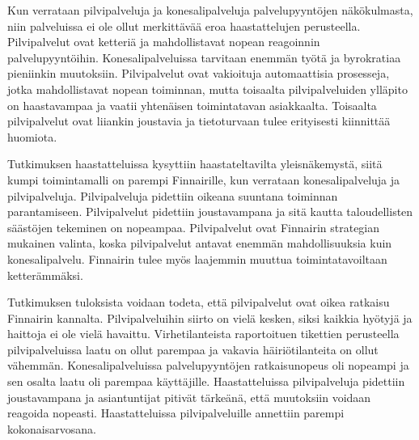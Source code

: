 Kun verrataan pilvipalveluja ja konesalipalveluja palvelupyyntöjen näkökulmasta, niin palveluissa ei ole ollut merkittävää eroa haastattelujen perusteella. Pilvipalvelut ovat ketteriä ja mahdollistavat nopean reagoinnin palvelupyyntöihin. Konesalipalveluissa tarvitaan enemmän työtä ja byrokratiaa pieniinkin muutoksiin. Pilvipalvelut ovat vakioituja automaattisia prosesseja, jotka mahdollistavat nopean toiminnan, mutta toisaalta pilvipalveluiden ylläpito on haastavampaa ja vaatii yhtenäisen toimintatavan asiakkaalta. Toisaalta pilvipalvelut ovat liiankin joustavia ja tietoturvaan tulee erityisesti kiinnittää huomiota.

Tutkimuksen haastatteluissa kysyttiin haastateltavilta yleisnäkemystä, siitä kumpi toimintamalli on parempi Finnairille, kun verrataan konesalipalveluja ja pilvipalveluja.  Pilvipalveluja pidettiin oikeana suuntana toiminnan parantamiseen. Pilvipalvelut pidettiin joustavampana ja sitä kautta taloudellisten säästöjen tekeminen on nopeampaa. Pilvipalvelut ovat Finnairin strategian mukainen valinta, koska pilvipalvelut antavat enemmän mahdollisuuksia kuin konesalipalvelu. Finnairin tulee myös laajemmin muuttua toimintatavoiltaan ketterämmäksi.

Tutkimuksen tuloksista voidaan todeta, että pilvipalvelut ovat oikea ratkaisu Finnairin kannalta. Pilvipalveluihin siirto on vielä kesken, siksi kaikkia hyötyjä ja haittoja ei ole vielä havaittu. Virhetilanteista raportoituen tikettien perusteella pilvipalveluissa laatu on ollut parempaa ja vakavia häiriötilanteita on ollut vähemmän. Konesalipalveluissa palvelupyyntöjen ratkaisunopeus oli nopeampi ja sen osalta laatu oli parempaa käyttäjille. Haastatteluissa pilvipalveluja pidettiin joustavampana ja asiantuntijat pitivät tärkeänä, että muutoksiin voidaan reagoida nopeasti. Haastatteluissa pilvipalveluille annettiin parempi kokonaisarvosana. 


